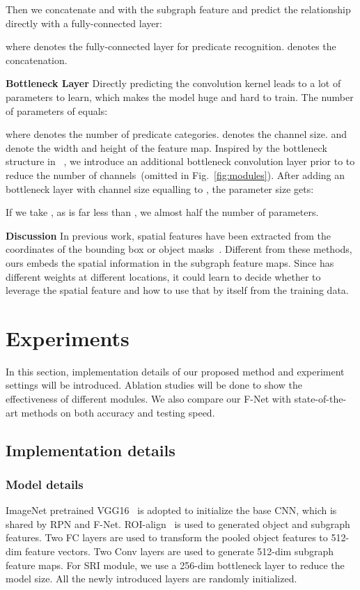 \documentclass[runningheads]{llncs}
\begin{document}
Then we concatenate  and  with the subgraph feature  and predict the relationship directly with a fully-connected layer:



\noindent where  denotes the fully-connected layer for predicate recognition.  denotes the concatenation. 

\noindent\textbf{Bottleneck Layer}
Directly predicting the convolution kernel leads to a lot of parameters to learn, which makes the model huge and hard to train. The number of parameters of  equals:

\noindent where  denotes the number of predicate categories.  denotes the channel size.  and  denote the width and height of the feature map. 
Inspired by the bottleneck structure in ~\cite{resnet}, we introduce an additional  bottleneck convolution layer prior to  to reduce the number of channels~(omitted in Fig.~\ref{fig:modules}).
After adding an bottleneck layer with channel size equalling to , the parameter size gets:

If we take , as  is far less than , we almost half the number of parameters. 

\noindent\textbf{Discussion}
In previous work, spatial features have been extracted from the coordinates of the bounding box or object masks~\cite{dai2017detecting,liao2017natural,yu2017visual}. Different from these methods, ours embeds the spatial information in the subgraph feature maps. Since  has different weights at different locations, it could learn to decide whether to leverage the spatial feature and how to use that by itself from the training data. 

\section{Experiments}
In this section, implementation details of our proposed method and experiment settings will be introduced. Ablation studies will be done to show the effectiveness of different modules. We also compare our F-Net with state-of-the-art methods on both accuracy and testing speed. 

\subsection{Implementation details}
\subsubsection{Model details} ImageNet pretrained VGG16~\cite{VGG} is adopted to initialize the base CNN, which is shared by RPN and F-Net. ROI-align~\cite{he2017mask} is used to generated  object and subgraph features. Two FC layers are used to transform the pooled object features to 512-dim feature vectors. Two  Conv layers are used to generate 512-dim subgraph feature maps. For SRI module, we use a 256-dim bottleneck layer to reduce the model size. All the newly introduced layers are randomly initialized. 
\end{document}
